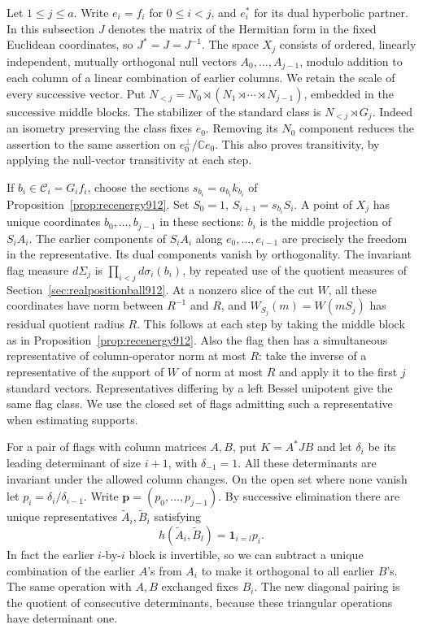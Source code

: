 \documentclass[a4paper,11pt]{article}
\theoremstyle{definition}
\theoremstyle{remark}
\numberwithin{equation}{section}
\begin{document}
Let \(1\le j\le a\). Write \(e_i=f_i\) for \(0\le i<j\),
and \(e_i^*\) for its dual hyperbolic partner. In this subsection
\(J\) denotes the matrix of the Hermitian form in the fixed Euclidean
coordinates, so \(J^*=J=J^{-1}\). The space \(X_j\) consists of
ordered, linearly independent, mutually orthogonal null vectors
\(A_0,\ldots,A_{j-1}\), modulo addition to each column of a linear
combination of earlier columns. We retain the scale of every
successive vector. Put \(N_{<j}=N_0\rtimes(N_1\rtimes\cdots
\rtimes N_{j-1})\), embedded in the successive middle blocks.
The stabilizer of the standard class is \(N_{<j}\rtimes G_j\).
Indeed an isometry preserving the class fixes \(e_0\). Removing
its \(N_0\) component reduces the assertion to the same assertion
on \(e_0^\perp/\mathbb C e_0\). This also proves transitivity,
by applying the null-vector transitivity at each step.

If \(b_i\in\mathcal C_i=G_i f_i\), choose the sections
\(s_{b_i}=a_{b_i}k_{b_i}\) of
Proposition~\ref{prop:recenergy912}. Set \(S_0=1\),
\(S_{i+1}=s_{b_i}S_i\). A point of \(X_j\) has unique coordinates
\(b_0,\ldots,b_{j-1}\) in these sections: \(b_i\) is the middle
projection of \(S_i A_i\). The earlier components of \(S_i A_i\)
along \(e_0,\ldots,e_{i-1}\) are precisely the freedom in
the representative. Its dual components vanish by orthogonality.
The invariant flag measure \(d\Sigma_j\) is
\(\prod_{i<j}d\sigma_i(b_i)\), by repeated use of the quotient
measures of Section~\ref{sec:realpositionball912}. At a nonzero
slice of the cut \(W\), all these coordinates have norm between
\(R^{-1}\) and \(R\), and \(W_{S_j}(m)=W(m S_j)\) has residual
quotient radius \(R\). This follows at each step by taking the
middle block as in Proposition~\ref{prop:recenergy912}. Also the
flag then has a simultaneous representative of column-operator
norm at most \(R\): take the inverse of a representative of the
support of \(W\) of norm at most \(R\) and apply it to the first
\(j\) standard vectors. Representatives differing by a left
Bessel unipotent give the same flag class. We use the closed set
of flags admitting such a representative when estimating supports.

For a pair of flags with column matrices \(A,B\), put
\(K=A^*JB\) and let \(\delta_i\) be its leading determinant
of size \(i+1\), with \(\delta_{-1}=1\). All these determinants
are invariant under the allowed column changes. On the open set
where none vanish let \(p_i=\delta_i/\delta_{i-1}\).
Write \(\mathbf p=(p_0,\ldots,p_{j-1})\). By successive
elimination there are unique representatives \(\widetilde A_i,
\widetilde B_i\) satisfying
\[
             h(\widetilde A_i,\widetilde B_l)
                    ={\boldsymbol 1}_{i=l}p_i .
\]
In fact the earlier \(i\)-by-\(i\) block is invertible, so we
can subtract a unique combination of the earlier \(A\)'s
from \(A_i\) to make it orthogonal to all earlier \(B\)'s.
The same operation with \(A,B\) exchanged fixes \(B_i\).
The new diagonal pairing is the quotient of consecutive
determinants, because these triangular operations have
determinant one.
\end{document}
